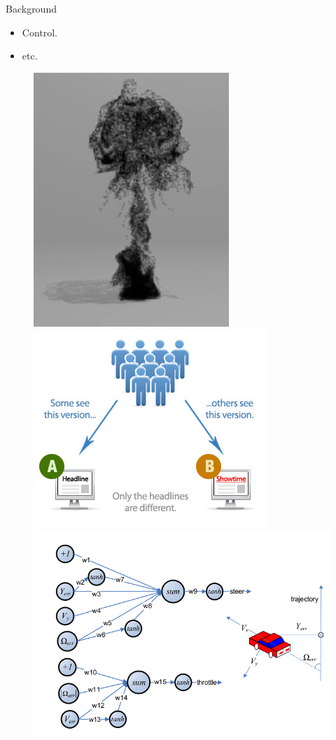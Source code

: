 \documentclass[final]{beamer}
\begin{document}
\begin{frame}[t]
\begin{columns}[T]
\begin{column}{.48\textwidth}
\begin{block}{Background}
\begin{minipage}[l]{0.63\columnwidth}
\begin{itemize}
   \item Control.
   \item etc.
   \end{itemize}
    \end{minipage}
  \begin{minipage}[r]{0.35\columnwidth}
     \begin{figure}[t]
      \includegraphics[width=0.45\columnwidth]{../Presentation/figs/animation}  
      \includegraphics[width=0.45\columnwidth]{../Presentation/figs/abtest}\\
      \includegraphics[width=0.55\columnwidth]{../Presentation/figs/control}
     \end{figure}
    \end{minipage}
  

\end{block}
\end{column}
\end{columns}
\end{frame}
\end{document}
